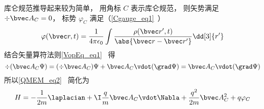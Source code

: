 

库仑规范推导起来较为简单， 用角标 $C$ 表示库仑规范， 则矢势满足 $\div \bvec A_C = 0$， 标势 $\varphi_C$ 满足（\autoref{Cgauge_eq1}~）
\begin{equation}
\varphi(\bvec r, t) = \frac{1}{4\pi\epsilon_0} \int \frac{\rho(\bvec r', t)}{\abs{\bvec r - \bvec r'}} \dd[3]{r'}
\end{equation}
结合矢量算符法则\autoref{VopEq_eq1}~ 得
\begin{equation}
\div (\bvec A_C \Psi) = (\div \bvec A_C) \Psi + \bvec A_C \vdot (\grad \Psi) = \bvec A_C \vdot (\grad \Psi)
\end{equation}
所以\autoref{QMEM_eq2}~ 简化为
\begin{equation}\label{CouGau_eq4}
H = -\frac{1}{2m} \laplacian + \I \frac{q}{m} \bvec A_C \vdot \Nabla + \frac{q^2}{2m} \bvec A_C^2 + q\varphi_C
\end{equation}
